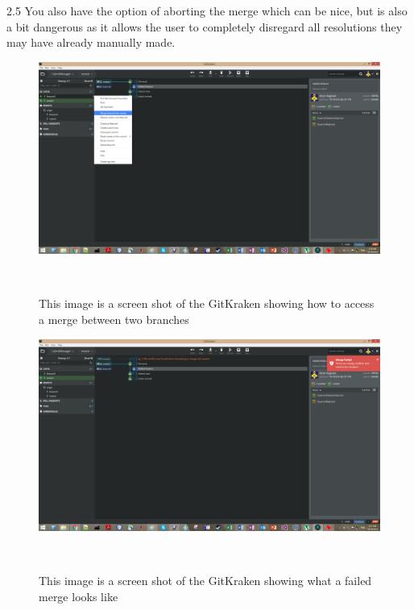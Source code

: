 \documentclass{sigchi}
\begin{document}
2.5 You also have the option of aborting the merge which can be nice, but is also a bit dangerous as it allows the user to completely disregard all resolutions they may have already manually made.

\begin{figure}
  \centering
  \includegraphics[width=1.75\columnwidth]{figures/GitKraken/MergeDropdown}
  \caption{This image is a screen shot of the GitKraken showing how to access a merge between two branches}~\label{fig:GitKrakenFigure4}
\end{figure}

\begin{figure}
  \centering
  \includegraphics[width=1.75\columnwidth]{figures/GitKraken/MergeFailedNotification}
  \caption{This image is a screen shot of the GitKraken showing what a failed merge looks like}~\label{fig:GitKrakenFigure5}
\end{figure}
\end{document}

